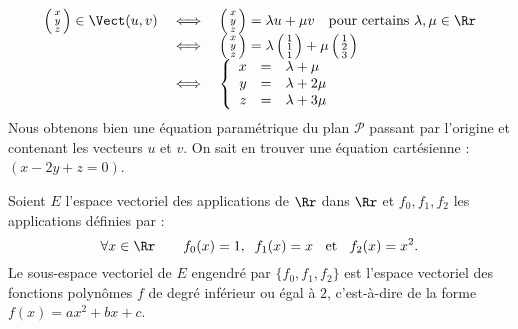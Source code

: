 \documentclass[class=report,crop=false]{standalone}
\begin{document}
\begin{exemple}
\begin{enumerate}
$$ \begin{array}{rcl}
 \left(\begin{smallmatrix}x \\ y \\ z \end{smallmatrix}\right) \in \Vect (u,v)
 & \iff & \left(\begin{smallmatrix}x \\ y \\ z \end{smallmatrix}\right) = \lambda u + \mu v  \quad \text{pour certains $\lambda,\mu \in \Rr$} \\
 & \iff & \left(\begin{smallmatrix}x \\ y \\ z \end{smallmatrix}\right) =
 \lambda\left(\begin{smallmatrix}1 \\ 1 \\ 1 \end{smallmatrix}\right) + \mu \left(\begin{smallmatrix}1 \\ 2 \\ 3 \end{smallmatrix}\right) \\
 & \iff &
 \left\{
 \begin{array}{rcl}
   x & = & \lambda + \mu \\
   y & = & \lambda + 2 \mu \\
   z & = & \lambda + 3 \mu \\
 \end{array}\right. \\
 \end{array} $$
Nous obtenons bien une équation paramétrique du plan $\mathcal{P}$
passant par l'origine et contenant les vecteurs $u$ et $v$.
On sait en trouver une équation cartésienne : $(x-2y+z=0)$.




\end{enumerate}
\end{exemple}


\begin{exemple}
Soient $E$ l'espace vectoriel des applications de $\Rr$ dans $\Rr$ et
$f_0, f_1, f_2$ les applications définies par :
$$\forall x \in \Rr \qquad f_0(x)=1, \;\; f_1(x)=x\;\;\text{ et } \;\; f_2(x)=x^2.$$
Le sous-espace vectoriel de $E$ engendré par $\{f_0, f_1, f_2\}$
est l'espace vectoriel des fonctions polynômes $f$ de degré inférieur
ou égal à $2$, c'est-à-dire de la forme $f(x) = ax^2+bx+c$.
\end{exemple}
\end{document}

